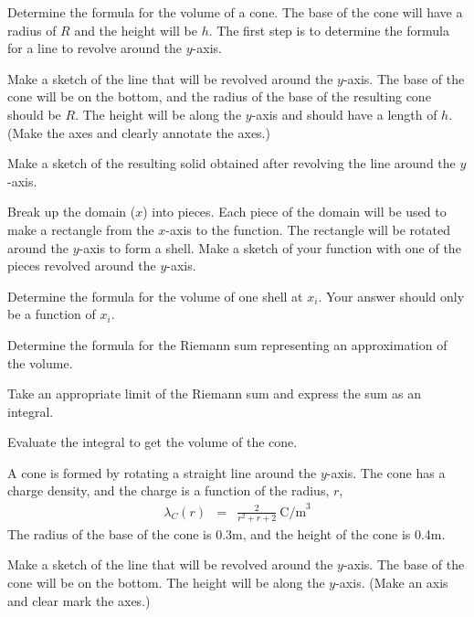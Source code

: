 \begin{problem}
  \item Determine the formula for the volume of a cone.
      The base of the cone will have a radius of $R$ and the height will be $h$.
      The first step is to determine the formula for a line to revolve around the $y$-axis.
    \begin{subproblem}
      \item
        Make a sketch of the line that will be revolved around the $y$-axis.
        The base of the cone will be on the bottom, and the radius of the base of the resulting cone should be $R$.
        The height will be along the $y$-axis and should have a length of $h$.
        (Make the axes and clearly annotate the axes.)
        \vfill

      \item Make a sketch of the resulting solid obtained after
        revolving the line around the $y$-axis.
        \vfill

      \item Break up the domain ($x$) into pieces. Each piece of the domain will be used to make a rectangle
           from the $x$-axis to the function. The rectangle will be rotated around the $y$-axis to form a shell.
           Make a sketch of your function with one of the pieces revolved around the $y$-axis.
        \vfill

      \clearpage

      \item Determine the formula for the volume of one shell at $x_i$. Your answer should only be a function of $x_i$.
        \vfill

      \item Determine the formula for the Riemann sum representing an approximation of the volume.
        \vfill

      \item Take an appropriate limit of the Riemann sum and express the sum as an integral.
        \vfill

      \item Evaluate the integral to get the volume of the cone.
        \vfill

    \end{subproblem}

    \clearpage

    \item A cone is formed by rotating a straight line around the $y$-axis.
       The cone has a charge density, and the charge is a function of the radius, $r$,
       \begin{eqnarray*}
         \lambda_C(r) & = & \frac{2}{r^2+r+2} ~ \mathrm{C/m}^3
       \end{eqnarray*}
       The radius of the base of the cone is 0.3m, and the height of the cone is 0.4m.
       \begin{subproblem}
         \item
           Make a sketch of the line that will be revolved around the $y$-axis.
           The base of the cone will be on the bottom.
           The height will be along the $y$-axis.
           (Make an axis and clear mark the axes.)
           \vfill


\end{subproblem}
\end{problem}
